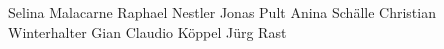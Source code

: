 Selina Malacarne
Raphael Nestler
Jonas Pult
Anina Schälle
Christian Winterhalter
Gian Claudio Köppel
Jürg Rast
